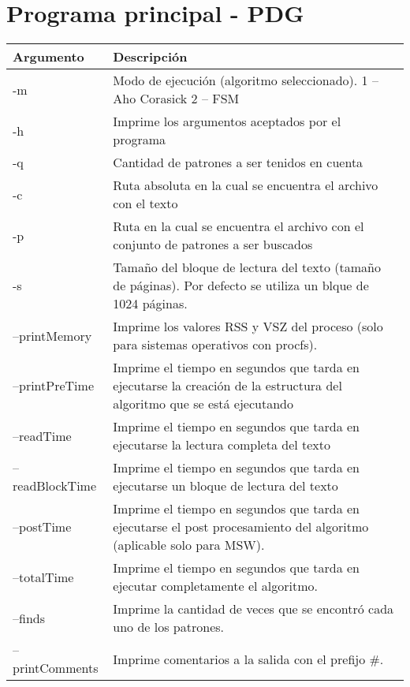 
\chapter{Programa principal - PDG} %

\label{AppendixA} %


\begin{center}

\begin{table}
 \label{tab:PDGArgs} 
\begin{tabular}{l p{10cm}}

\hline\hline
Argumento & Descripción\\
\hline
-m & Modo de ejecución (algoritmo seleccionado). 1 – Aho Corasick 2 – FSM\\
-h & Imprime los argumentos aceptados por el programa\\
-q & Cantidad de patrones a ser tenidos en cuenta\\
-c & Ruta absoluta en la cual se encuentra el archivo con el texto\\
-p & Ruta en la cual se encuentra el archivo con el conjunto de patrones a ser buscados\\
-s & Tamaño del bloque de lectura del texto (tamaño de páginas). Por defecto se utiliza un blque de 1024 páginas.\\
--printMemory & Imprime los valores RSS y VSZ del proceso (solo para sistemas operativos con procfs).\\
--printPreTime & Imprime el tiempo en segundos que tarda en ejecutarse la creación de la estructura del algoritmo que se está ejecutando\\
--readTime & Imprime el tiempo en segundos que tarda en ejecutarse la lectura completa del texto
\\
--readBlockTime & Imprime el tiempo en segundos que tarda en ejecutarse un bloque de lectura del texto\\
--postTime & Imprime el tiempo en segundos que tarda en ejecutarse el post procesamiento del algoritmo (aplicable solo para MSW).\\
--totalTime & Imprime el tiempo en segundos que tarda en ejecutar completamente el algoritmo.\\
--finds & Imprime la cantidad de veces que se encontró cada uno de los patrones. \\
--printComments & Imprime comentarios a la salida con el prefijo $\#$.\\
\hline
\end{tabular}
\label{table:PDG}
\end{table}
\end{center}